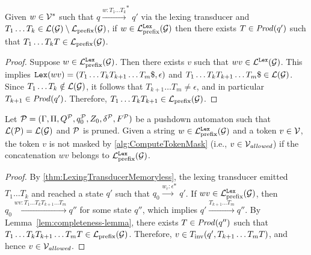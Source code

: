\begin{lemma}
    \label{lem:completeness-lemma}
    Given $w \in \mathcal{V}^\ast$ such that $q \xrightarrow{w: T_1 \ldots T_k}^\ast q'$ via the lexing transducer and $T_1 \ldots T_k \in \mathcal{L}(\mathcal{G}) \setminus \mathcal{L}_{\mathrm{prefix}}(\mathcal{G})$,
    if $w \in \mathcal{L}_{\mathrm{prefix}}^{\mathtt{Lex}}(\mathcal{G})$ then there exists $T \in \mathit{Prod}(q')$ such that $T_1 \ldots T_k T \in \mathcal{L}_{\mathrm{prefix}}(\mathcal{G})$.
\end{lemma}

\begin{proof}
    Suppose $w \in \mathcal{L}_{\mathrm{prefix}}^{\mathtt{Lex}}(\mathcal{G})$. Then there exists $v$ such that $wv \in \mathcal{L}^{\mathtt{Lex}}(\mathcal{G})$.
    This implies $\mathtt{Lex}(wv) = (T_1 \ldots T_k T_{k+1} \ldots T_m \$, \epsilon)$ and
    $T_1 \ldots T_k T_{k+1} \ldots T_m \$ \in \mathcal{L}(\mathcal{G})$.
    Since $T_1 \ldots T_k \notin \mathcal{L}(\mathcal{G})$, it follows that $T_{k+1} \ldots T_m \neq \epsilon$, and in particular $T_{k+1} \in \mathit{Prod}(q')$.
    Therefore, $T_1 \ldots T_k T_{k+1} \in \mathcal{L}_{\mathrm{prefix}}(\mathcal{G})$.
\end{proof}

\begin{theorem}
    \label{thm:TokenMaskCompleteness}
    \label{def:PDAPruned}
    Let $\mathcal{P} = (\Gamma, \Pi, Q^{\mathcal{P}}, q_0^{\mathcal{P}}, Z_0, \delta^{\mathcal{P}}, F^{\mathcal{P}})$ be a pushdown automaton such that $\mathcal{L}(\mathcal{P}) = \mathcal{L}(\mathcal{G})$ and $\mathcal{P}$ is pruned.
    Given a string $w \in \mathcal{L}_{\mathrm{prefix}}^{\mathtt{Lex}}(\mathcal{G})$ and a token $v \in \mathcal{V}$, the token $v$ is not masked by \autoref{alg:ComputeTokenMask}  (i.e., $v \in \mathcal{V}_{\textit{allowed}}$) if the concatenation $wv$ belongs to $\mathcal{L}_{\mathrm{prefix}}^{\mathtt{Lex}}(\mathcal{G})$.
\end{theorem}

\begin{proof}
    By \autoref{thm:LexingTransducerMemoryless}, the lexing transducer emitted $T_1 \ldots T_k$ and reached a state $q'$ such that $q_0 \xrightarrow{w_r: \epsilon}^\ast q'$.
    If $wv \in \mathcal{L}_{\mathrm{prefix}}^{\mathtt{Lex}}(\mathcal{G})$, then $q_0 \xrightarrow{wv: T_1 \ldots T_k T_{k+1} \ldots T_m} q''$ for some state $q''$, which implies $q' \xrightarrow{T_{k+1} \ldots T_m} q''$.
    By Lemma~\ref{lem:completeness-lemma}, there exists $T \in \mathit{Prod}(q'')$ such that $T_1 \ldots T_k T_{k+1} \ldots T_m T \in \mathcal{L}_{\mathrm{prefix}}(\mathcal{G})$.
    Therefore, $v \in T_{\textrm{inv}}(q', T_{k+1} \ldots T_m T)$, and hence $v \in \mathcal{V}_{\textit{allowed}}$.
\end{proof}

